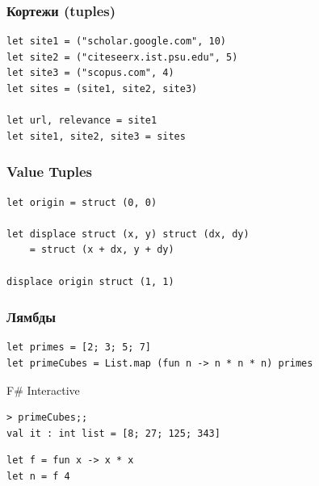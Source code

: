 \documentclass{../../slides-style}
\begin{document}
    \begin{frame}[fragile]
        \frametitle{Кортежи (tuples)}
        \begin{verbatim}
let site1 = ("scholar.google.com", 10)
let site2 = ("citeseerx.ist.psu.edu", 5)
let site3 = ("scopus.com", 4)
let sites = (site1, site2, site3)

let url, relevance = site1
let site1, site2, site3 = sites
        \end{verbatim}
    \end{frame}

    \begin{frame}[fragile]
        \frametitle{Value Tuples}
        \begin{verbatim}
let origin = struct (0, 0)

let displace struct (x, y) struct (dx, dy)
    = struct (x + dx, y + dy)

displace origin struct (1, 1)
        \end{verbatim}
    \end{frame}

    \begin{frame}[fragile]
        \frametitle{Лямбды}
        \begin{verbatim}
let primes = [2; 3; 5; 7]
let primeCubes = List.map (fun n -> n * n * n) primes
        \end{verbatim}
        \begin{alertblock}{F\# Interactive}
            \begin{verbatim}
> primeCubes;;
val it : int list = [8; 27; 125; 343]
            \end{verbatim}
        \end{alertblock}
        \begin{verbatim}
let f = fun x -> x * x
let n = f 4
        \end{verbatim}
    \end{frame}
\end{document}

